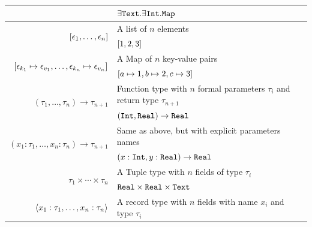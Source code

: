 \begin{table}[!ht]
{\begin{tabular}{rl}
	                                                                                            		& $\exists\texttt{Text}.\exists\texttt{Int}.\texttt{Map}$                                                     \\\hline
			\multirow{2}{*}{$\left[\epsilon_1,\dotsc,\epsilon_n\right]$}                                           & A list of $n$ elements                                                              \\
	                                                                                            		& $\left[1,2,3\right]$                                                                     \\\hline
			\multirow{2}{*}{$\left[\epsilon_{k_1}\mapsto\epsilon_{v_1},\dotsc,\epsilon_{k_n}\mapsto\epsilon_{v_n}\right]$} & A Map of $n$ key-value pairs                                                        \\
	                                                                                            		& $\left[a\mapsto1,b\mapsto2,c\mapsto3\right]$                                               \\\hline
			\multirow{2}{*}{$(\tau_1,\dotsc,\tau_n)\to\tau_{n+1}$}                                      & Function type with $n$ formal parameters $\tau_i$ and return type $\tau_{n+1}$      \\
			                                                                                            & $(\texttt{Int},\texttt{Real})\to\texttt{Real}$                                                              \\\hline
			\multirow{2}{*}{$(x_1:\tau_1,\dotsc,x_n:\tau_n)\to\tau_{n+1}$}                              & Same as above, but with explicit parameters names                                   \\
			                                                                                            & $(x:\texttt{Int},y:\texttt{Real})\to\texttt{Real}$                                                              \\\hline
			\multirow{2}{*}{$\tau_1 \times \dotsb \times \tau_n$}                                       & A Tuple type with $n$ fields of type $\tau_i$                                       \\
	                                                                                            		& $\texttt{Real} \times \texttt{Real} \times \texttt{Text}$                                                   \\\hline
			\multirow{2}{*}{$\left<x_1:\tau_1,\dotsc,x_n:\tau_n\right>$}                                     & A record type with $n$ fields with name $x_i$ and type $\tau_i$                     \\

\end{tabular}}
\end{table}

